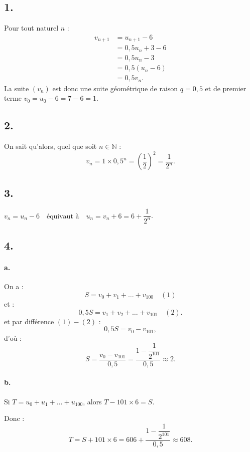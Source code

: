 \subsection*{1.}

Pour tout naturel \(n\) :
\begin{align*}
v_{n+1} &= u_{n+1} - 6 \\
&= 0{,}5u_n + 3 - 6 \\
&= 0{,}5u_n - 3 \\
&= 0{,}5(u_n - 6) \\
&= 0{,}5v_n.
\end{align*}
La suite \((v_n)\) est donc une suite géométrique de raison \(q = 0{,}5\) et de premier terme \( v_0 = u_0 - 6 = 7 - 6 = 1 \).

\subsection*{2.}

On sait qu'alors, quel que soit \(n \in \mathbb{N} \) :
\[
v_n = 1 \times 0{,}5^n = \left(\dfrac{1}{2}\right)^2 = \dfrac{1}{2^n}.
\]

\subsection*{3.}

\(v_n = u_n - 6 \quad \text{équivaut à} \quad u_n = v_n + 6 = 6 + \dfrac{1}{2^n}\).

\subsection*{4.}

\paragraph{a.} On a :
\[
S = v_0 + v_1 + \dots + v_{100} \quad (1)
\]
et :
\[
0{,}5S = v_1 + v_2 + \dots + v_{101} \quad (2).
\]
et par différence \((1) - (2)\) :
\[
0{,}5S = v_0 - v_{101},
\]
d'où :
\[
S = \dfrac{v_0 - v_{101}}{0,5} = \dfrac{1 - \dfrac{1}{2^{101}}}{0,5} \approx 2.
\]

\paragraph{b.} Si \( T = u_0 + u_1 + \dots + u_{100} \), alors \( T - 101 \times 6 = S \).

Donc :
\[
T = S + 101 \times 6 = 606 + \dfrac{1 - \dfrac{1}{2^{101}}}{0,5} \approx 608.
\]
